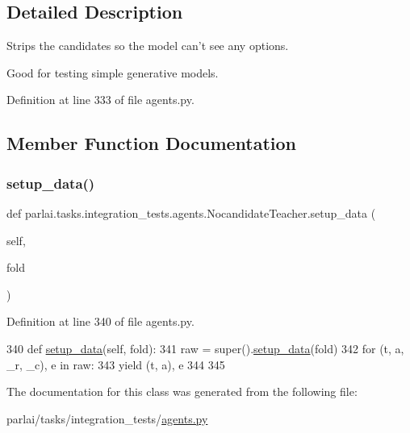 \subsection{Detailed Description}
\begin{DoxyVerb}Strips the candidates so the model can't see any options.

Good for testing simple generative models.
\end{DoxyVerb}
 

Definition at line 333 of file agents.\+py.



\subsection{Member Function Documentation}
\mbox{\label{classparlai_1_1tasks_1_1integration__tests_1_1agents_1_1NocandidateTeacher_a0cf2accf985db966f44f77a7328fcff2}} 
\subsubsection{\texorpdfstring{setup\+\_\+data()}{setup\_data()}}
{\footnotesize\ttfamily def parlai.\+tasks.\+integration\+\_\+tests.\+agents.\+Nocandidate\+Teacher.\+setup\+\_\+data (\begin{DoxyParamCaption}\item[{}]{self,  }\item[{}]{fold }\end{DoxyParamCaption})}



Definition at line 340 of file agents.\+py.


\begin{DoxyCode}
340     \textcolor{keyword}{def }\hyperlink{namespaceparlai_1_1tasks_1_1multinli_1_1agents_a4fa2cb0ba1ed745336ad8bceed36b841}{setup\_data}(self, fold):
341         raw = super().\hyperlink{namespaceparlai_1_1tasks_1_1multinli_1_1agents_a4fa2cb0ba1ed745336ad8bceed36b841}{setup\_data}(fold)
342         \textcolor{keywordflow}{for} (t, a, \_r, \_c), e \textcolor{keywordflow}{in} raw:
343             \textcolor{keywordflow}{yield} (t, a), e
344 
345 
\end{DoxyCode}


The documentation for this class was generated from the following file\+:\begin{DoxyCompactItemize}
\item 
parlai/tasks/integration\+\_\+tests/\hyperlink{parlai_2tasks_2integration__tests_2agents_8py}{agents.\+py}\end{DoxyCompactItemize}
